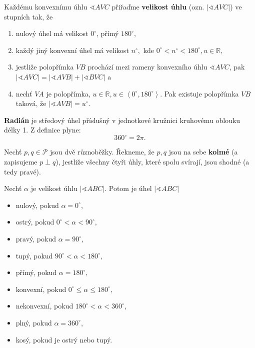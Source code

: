 \begin{definition}
  Každému konvexnímu úhlu $\sphericalangle AVC$ přiřaďme \textbf{velikost úhlu} (ozn. $|\sphericalangle AVC|$) ve stupních tak, že
  \begin{enumerate}[$i.$]
    \item nulový úhel má velikost $0^\circ$, přímý $180^\circ$,
    \item každý jiný konvexní úhel má velikost $n^\circ, $ kde $0^\circ< n ^\circ< 180^\circ, u \in \mathbb R,$
    \item jestliže polopřímka $VB$ prochází mezi rameny konvexního úhlu $\sphericalangle AVC$, pak $|\sphericalangle AVC|=|\sphericalangle AVB|+ |\sphericalangle BVC|$ a
    \item nechť $VA$ je polopřímka, $u \in \mathbb R, u \in \left < 0 ^\circ,180^\circ \right >$. Pak existuje polopřímka $VB$ taková, že $|\sphericalangle AVB|=u^\circ.$
  \end{enumerate}
\end{definition}

\begin{pozn}
  \textbf{Radián} je středový úhel příslušný v jednotkové kružnici kruhovému oblouku délky 1. Z definice plyne:
  \[
    360^\circ = 2\pi.
  \]
\end{pozn}

\begin{definition}
  Nechť $p,q\in \mathscr P$ jsou dvě různoběžky. Řekneme, že $p,q$ jsou na sebe \textbf{kolmé} (a zapisujeme $p\perp q$), jestliže všechny čtyři úhly, které spolu svírají, jsou shodné (a tedy pravé).
\end{definition}

\begin{pozn}
  Nechť $\alpha$ je velikost úhlu $|\sphericalangle ABC|$. Potom je úhel $|\sphericalangle ABC|$
  \begin{itemize}
    \item nulový, pokud $\alpha=0^\circ$,
  \item ostrý, pokud $0^\circ <\alpha < 90^\circ,$
  \item pravý, pokud $\alpha = 90^\circ,$
  \item tupý, pokud $90^\circ < \alpha < 180^\circ,$
  \item přímý, pokud $\alpha = 180^\circ,$
  \item konvexní, pokud $0^\circ \leq \alpha \leq 180^\circ,$
  \item nekonvexní, pokud $180^\circ < \alpha < 360^\circ$,
  \item plný, pokud $\alpha = 360^\circ,$
  \item kosý, pokud je ostrý nebo tupý.
  \end{itemize}
\end{pozn}

